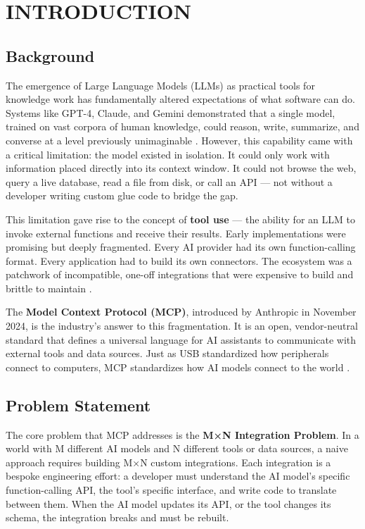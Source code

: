 
\chapter{INTRODUCTION}

\section{Background}
The emergence of Large Language Models (LLMs) as practical tools for knowledge work has fundamentally altered expectations of what software can do. Systems like GPT-4, Claude, and Gemini demonstrated that a single model, trained on vast corpora of human knowledge, could reason, write, summarize, and converse at a level previously unimaginable \cite{anthropic2024mcp}. However, this capability came with a critical limitation: the model existed in isolation. It could only work with information placed directly into its context window. It could not browse the web, query a live database, read a file from disk, or call an API — not without a developer writing custom glue code to bridge the gap.

This limitation gave rise to the concept of \textbf{tool use} — the ability for an LLM to invoke external functions and receive their results. Early implementations were promising but deeply fragmented. Every AI provider had its own function-calling format. Every application had to build its own connectors. The ecosystem was a patchwork of incompatible, one-off integrations that were expensive to build and brittle to maintain \cite{anthropic2024mcp}.

The \textbf{Model Context Protocol (MCP)}, introduced by Anthropic in November 2024, is the industry's answer to this fragmentation. It is an open, vendor-neutral standard that defines a universal language for AI assistants to communicate with external tools and data sources. Just as USB standardized how peripherals connect to computers, MCP standardizes how AI models connect to the world \cite{anthropic2024mcp}.

\section{Problem Statement}
The core problem that MCP addresses is the \textbf{M×N Integration Problem}. In a world with M different AI models and N different tools or data sources, a naive approach requires building M×N custom integrations. Each integration is a bespoke engineering effort: a developer must understand the AI model's specific function-calling API, the tool's specific interface, and write code to translate between them. When the AI model updates its API, or the tool changes its schema, the integration breaks and must be rebuilt.

